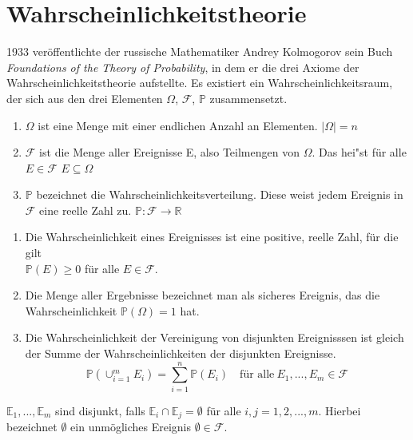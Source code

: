 


\section{Wahrscheinlichkeitstheorie}


\vspace{15pt}


1933 ver\"offentlichte der russische Mathematiker Andrey Kolmogorov sein Buch \textit{Foundations of the Theory of Probability}, in dem er die drei Axiome der Wahrscheinlichkeitstheorie aufstellte. Es existiert ein Wahrscheinlichkeitsraum, der sich aus den drei Elementen $\Omega$, $\mathcal{F}$, $\mathbb{P}$ zusammensetzt.

\vspace{5pt}

\begin{enumerate}
	\item $\Omega$ ist eine Menge mit einer endlichen Anzahl an Elementen. $|\Omega|= n $
	\item $\mathcal{F}$ ist die Menge aller Ereignisse E, also Teilmengen von $\Omega$. Das hei"st f\"ur alle $E \in \mathcal{F}$  $E \subseteq \Omega$
	\item $\mathbb{P}$ bezeichnet die Wahrscheinlichkeitsverteilung. Diese weist jedem Ereignis in $\mathcal{F}$ eine reelle Zahl zu.  $\mathbb{P}: \mathcal{F} \longrightarrow \mathbb{R}$
	
	
\end{enumerate}

\vspace{10pt}



\begin{Def}

\vspace{5pt}

\begin{enumerate}
	\item Die Wahrscheinlichkeit eines Ereignisses ist eine positive, reelle Zahl, f\"ur die gilt \\ $\mathbb{P} (E) \geq 0$ f\"ur alle $E \in \mathcal{F}$.
	\item Die Menge aller Ergebnisse bezeichnet man als sicheres Ereignis, das die Wahrscheinlichkeit $\mathbb{P} (\Omega) = 1$ hat.
	\item Die Wahrscheinlichkeit der Vereinigung von disjunkten Ereignisssen ist gleich der Summe der Wahrscheinlichkeiten der disjunkten Ereignisse. 
	\vspace{3pt}
	\begin{equation*}
	\mathbb{P} (\cup_{i=1}^m E_{i}) = \sum_{i=1}^n \mathbb{P} (E_{i}) \quad \text{f\"ur alle} \: E_{1},...,E_{m} \in \mathcal{F}
	\end{equation*}
\end{enumerate}
\vspace{5pt}

$\mathbb{E}_{1},...,\mathbb{E}_{m}$ sind disjunkt, falls $\mathbb{E}_{i} \cap \mathbb{E}_{j} = \emptyset$ f\"ur alle $i,j= 1,2,...,m$. 
Hierbei bezeichnet $\emptyset$ ein unm\"ogliches Ereignis $\emptyset \in \mathcal{F}$.
\end{Def}

